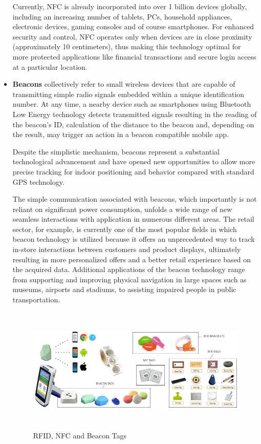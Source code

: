 \begin{itemize}
  Currently, NFC is already incorporated into over 1 billion devices globally, including an increasing number of tablets, PCs, household appliances, electronic devices, gaming consoles and of course smartphones. For enhanced security and control, NFC operates only when devices are in close proximity (approximately 10 centimeters), thus making this technology optimal for more protected applications like financial transactions and secure login access at a particular location. 
 
  \item \textbf{Beacons} \label{beacons} collectively refer to small wireless devices that are capable of transmitting simple radio signals embedded within a unique identification number. At any time, a nearby device such as smartphones using Bluetooth Low Energy technology detects transmitted signals resulting in the reading of the beacon's ID, calculation of the distance to the beacon and, depending on the result, may trigger an action in a beacon compatible mobile app. 
  
  Despite the simplistic mechanism, beacons represent a substantial technological advancement and have opened new opportunities to allow more precise tracking for indoor positioning and behavior compared with standard GPS technology.
  
  The simple communication associated with beacons, which importantly is not reliant on significant power consumption, unfolds a wide range of new seamless interactions with application in numerous different areas. The retail sector, for example, is currently one of the most popular fields in which beacon technology is utilized because it offers an unprecedented way to track in-store interactions between customers and product displays, ultimately resulting in more personalized offers and a better retail experience based on the acquired data. Additional applications of the beacon technology range from supporting and improving physical navigation in large spaces such as museums, airports and stadiums, to assisting impaired people in public transportation.

  \vspace{0.5cm}
  \begin{figure}[htbp]
    \centering
      \includegraphics[height=6cm]{images/iot-devices.jpg}
    \caption{RFID, NFC and Beacon Tags}
    \label{fig:devices}
  \end{figure}
  \vspace{0.5cm}


\end{itemize}
